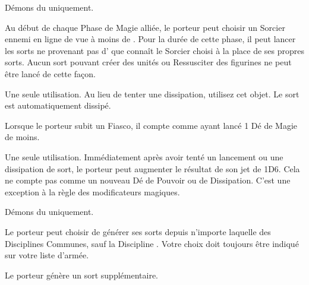 \begin{multicols}{2}
Démons du \textbf{\dchange} uniquement.

Au début de chaque Phase de Magie alliée, le porteur peut choisir un Sorcier ennemi en ligne de vue à moins de . Pour la durée de cette phase, il peut lancer les sorts ne provenant pas d'\boundspell{} que connaît le Sorcier choisi à la place de ses propres sorts. Aucun sort pouvant créer des unités ou Ressusciter des figurines ne peut être lancé de cette façon.

Une seule utilisation. Au lieu de tenter une dissipation, utilisez cet objet. Le sort est automatiquement dissipé.

Lorsque le porteur subit un Fiasco, il compte comme ayant lancé 1 Dé de Magie de moins.

Une seule utilisation. Immédiatement après avoir tenté un lancement ou une dissipation de sort, le porteur peut augmenter le résultat de son jet de 1D6. Cela ne compte pas comme un nouveau Dé de Pouvoir ou de Dissipation. C'est une exception à la règle des modificateurs magiques.

Démons du \textbf{\dchange} uniquement.

Le porteur peut choisir de générer ses sorts depuis n'importe laquelle des Disciplines Communes, sauf la Discipline \light{}. Votre choix doit toujours être indiqué sur votre liste d'armée.

Le porteur génère un sort supplémentaire.

\endpricelist

\end{multicols}
\closearmynewsection













\quickrefsheettitle


